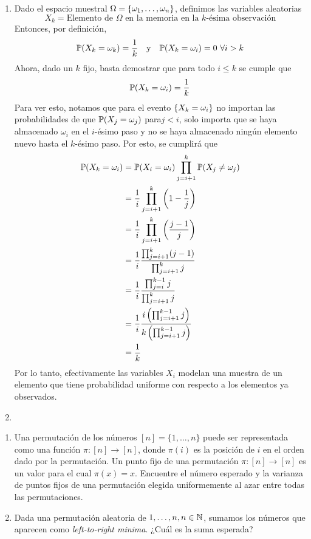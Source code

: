 \begin{solucion}
	\begin{enumerate}[label=\arabic*.]
		\item Dado el espacio muestral $\Omega = \left\{\omega_1, \dots, \omega_n\right\}$, definimos las variables aleatorias
			\[
				X_k = \text{Elemento de $\Omega$ en la memoria en la $k$-ésima observación}
			\]
		Entonces, por definición,
		\begin{align*}
			\mathbb{P}(X_k = \omega_k) = \frac{1}{k} && \text{y} && \mathbb{P}(X_k = \omega_i) = 0 \ \forall i > k
		\end{align*}
		Ahora, dado un $k$ fijo, basta demostrar que para todo $i\leq k$ se cumple que
			\[
				\mathbb{P}(X_k = \omega_i) = \frac{1}{k}
			\]
		Para ver esto, notamos que para el evento $\left\{X_k = \omega_i\right\}$ no importan las probabilidades de que $\mathbb{P}(X_j = \omega_j)$ para$j<i$, solo importa que se haya almacenado $\omega_i$ en el $i$-ésimo paso y no se haya almacenado ningún elemento nuevo hasta el $k$-ésimo paso. Por esto, se cumplirá que
			\begin{align*}
				\mathbb{P}(X_k = \omega_i) &= \mathbb{P}(X_i = \omega_i)\prod_{j=i+1}^{k}\mathbb{P}(X_j \neq \omega_j) \\
						    &= \frac{1}{i}\prod_{j=i+1}^{k}\left(1-\frac{1}{j}\right) \\
						    &= \frac{1}{i}\prod_{j=i+1}^{k}\left(\frac{j-1}{j}\right) \\
						    &= \frac{1}{i}\frac{\prod_{j=i+1}^{k}(j-1)}{\prod_{j=i+1}^{k}j} \\
						    &= \frac{1}{i}\frac{\prod_{j=i}^{k-1}j}{\prod_{j=i+1}^{k}j} \\
						    &= \frac{1}{i}\frac{i\left(\prod_{j=i+1}^{k-1}j\right)}{k\left(\prod_{j=i+1}^{k-1}j\right)} \\
						    &= \frac{1}{k}
			\end{align*}
			Por lo tanto, efectivamente las variables $X_i$ modelan una muestra de un elemento que tiene probabilidad uniforme con respecto a los elementos ya observados.
		\item
	\end{enumerate}
\end{solucion}

\newpage
\begin{problema}{2}
	\begin{enumerate}[label=\arabic*.]
		\item Una permutación de los números $[n] = \{1,\dots, n\}$ puede ser representada como una función $\pi : [n] \to [n]$, donde $\pi(i)$ es la posición de $i$ en el orden dado por la permutación. Un punto fijo de una permutación $\pi : [n] \to [n]$ es un valor para el cual $\pi(x) = x$. Encuentre el número esperado y la varianza de puntos fijos de una permutación elegida uniformemente al azar entre todas las permutaciones.
		\item Dada una permutación aleatoria de ${1, \dots , n}, n \in \mathbb{N}$, sumamos los números que aparecen como \emph{left-to-right minima}. ¿Cuál es la suma esperada?
	\end{enumerate}
\end{problema}
\begin{solucion}
	
\end{solucion}

